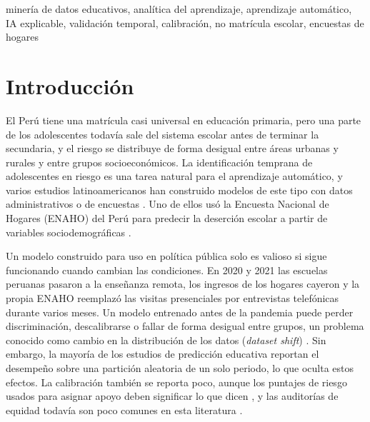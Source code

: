 \documentclass[conference]{IEEEtran}
\begin{document}
\begin{IEEEkeywords}
minería de datos educativos, analítica del aprendizaje, aprendizaje automático, IA explicable, validación temporal, calibración, no matrícula escolar, encuestas de hogares
\end{IEEEkeywords}

\section{Introducción}

El Perú tiene una matrícula casi universal en educación primaria, pero una parte de los adolescentes todavía sale del sistema escolar antes de terminar la secundaria, y el riesgo se distribuye de forma desigual entre áreas urbanas y rurales y entre grupos socioeconómicos. La identificación temprana de adolescentes en riesgo es una tarea natural para el aprendizaje automático, y varios estudios latinoamericanos han construido modelos de este tipo con datos administrativos o de encuestas \cite{rodriguez2023,jacha2024,jimenez2024}. Uno de ellos usó la Encuesta Nacional de Hogares (ENAHO) del Perú para predecir la deserción escolar a partir de variables sociodemográficas \cite{jacha2024}.

Un modelo construido para uso en política pública solo es valioso si sigue funcionando cuando cambian las condiciones. En 2020 y 2021 las escuelas peruanas pasaron a la enseñanza remota, los ingresos de los hogares cayeron y la propia ENAHO reemplazó las visitas presenciales por entrevistas telefónicas durante varios meses. Un modelo entrenado antes de la pandemia puede perder discriminación, descalibrarse o fallar de forma desigual entre grupos, un problema conocido como cambio en la distribución de los datos (\textit{dataset shift}) \cite{moreno2012}. Sin embargo, la mayoría de los estudios de predicción educativa reportan el desempeño sobre una partición aleatoria de un solo periodo, lo que oculta estos efectos. La calibración también se reporta poco, aunque los puntajes de riesgo usados para asignar apoyo deben significar lo que dicen \cite{vancalster2019}, y las auditorías de equidad todavía son poco comunes en esta literatura \cite{baker2022}.
\end{document}
